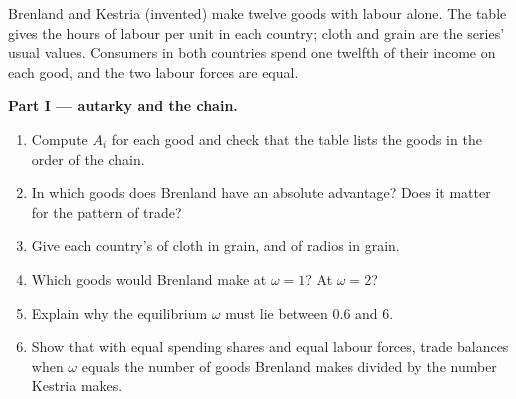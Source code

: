 \begin{problem}\label{pb:b3:ricardian-trade:twelve}
Brenland and Kestria (invented) make twelve goods with labour alone. The table
gives the hours of labour per unit in each country; cloth and grain are the
series' usual values. Consumers in both countries spend one twelfth of their
income on each good, and the two labour forces are equal. %

\begin{center}\small
{}
\qquad
{}
\end{center}

\medskip\noindent\textbf{Part I --- autarky and the chain.}
\begin{enumerate}
\item Compute $A_i$ for each good and check that the table lists the goods in
the order of the chain.
\item In which goods does Brenland have an absolute advantage? Does it matter
for the pattern of trade?
\item Give each country's  of cloth in grain, and of radios in
grain.
\item Which goods would Brenland make at $\omega = 1$? At $\omega = 2$?
\item Explain why the equilibrium $\omega$ must lie between 0.6 and 6.
\item Show that with equal spending shares and equal labour forces, trade
balances when $\omega$ equals the number of goods Brenland makes divided by the
number Kestria makes.
\end{enumerate}


\end{problem}
